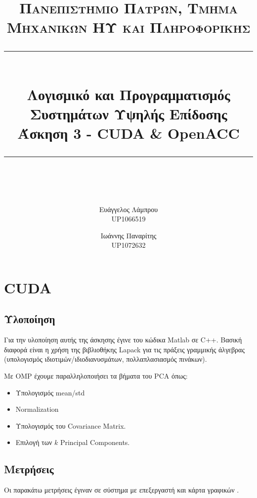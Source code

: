 \documentclass[11pt]{scrartcl} %
\title{	
	\normalfont\normalsize
	\textsc{Πανεπιστήμιο Πατρών, Τμήμα Μηχανικών ΗΥ και Πληροφορικής}\\ %
	\vspace{25pt} %
	\rule{\linewidth}{0.5pt}\\ %
	\vspace{20pt} %
    {\LARGE Λογισμικό και Προγραμματισμός Συστημάτων Υψηλής Επίδοσης\\ Άσκηση 3 - CUDA \& OpenACC}\\ %
	\vspace{12pt} %
	\rule{\linewidth}{2pt}\\ %
	\vspace{12pt} %
}
\author{Ευάγγελος Λάμπρου \\UP1066519 \and Ιωάννης Παναρίτης \\UP1072632} %
\date{} %
\begin{document}
\maketitle 

\section{CUDA}

\subsection{Υλοποίηση}

Για την υλοποίηση αυτής της άσκησης έγινε  του κώδικα Matlab σε C++.
Βασική διαφορά είναι η χρήση της βιβλιοθήκης Lapack για τις πράξεις γραμμικής άλγεβρας (υπολογισμός ιδιοτιμών/ιδιοδιανυσμάτων, πολλαπλασιασμός πινάκων).

Με OMP έχουμε παραλληλοποιήσει τα βήματα του PCA όπως: 

\begin{itemize}
    \item Υπολογισμός mean/std 
    \item Normalization
    \item Υπολογισμός του Covariance Matrix.
    \item Επιλογή των $k$ Principal Components.
\end{itemize}

\subsection{Μετρήσεις}

Οι παρακάτω μετρήσεις έγιναν σε σύστημα με επεξεργαστή  και κάρτα γραφικών .

\end{document}
